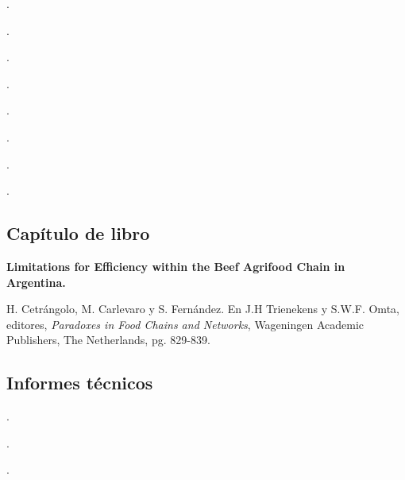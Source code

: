 \begin{etaremune}
\item {}.
\item {}.
\item {}.
\item {}.
\item {}.
\item {}.
\item {}.
\item {}.
\end{etaremune}


\subsection{Capítulo de libro}
\textbf{Limitations for Efficiency within the Beef Agrifood Chain in Argentina.}
 
 H. Cetrángolo, M. Carlevaro y S. Fernández. En J.H Trienekens y S.W.F. Omta, editores,  \textit{Paradoxes in Food Chains and Networks}, Wageningen Academic Publishers, The Netherlands, pg. 829-839.
 
 \subsection{Informes técnicos}
 \begin{etaremune}
  \item {} .
  \item {} .
  \item {} . 
 \end{etaremune}

 
